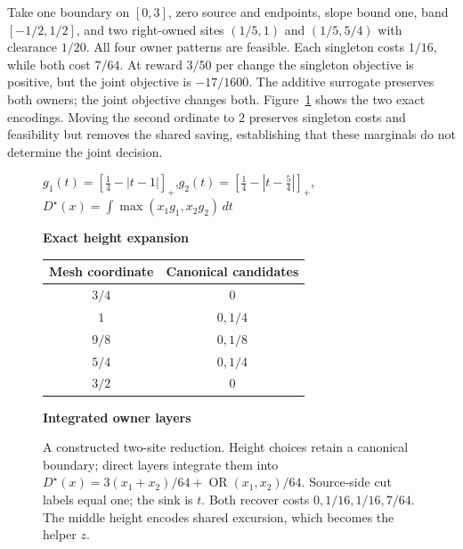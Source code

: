 \documentclass[10pt,letterpaper]{article}
\begin{document}
Take one boundary on $[0,3]$, zero source and endpoints, slope bound one, band $[-1/2,1/2]$, and two right-owned sites $(1/5,1)$ and $(1/5,5/4)$ with clearance $1/20$. All four owner patterns are feasible. Each singleton costs $1/16$, while both cost $7/64$. At reward $3/50$ per change the singleton objective is positive, but the joint objective is $-17/1600$. The additive surrogate preserves both owners; the joint objective changes both. Figure~\ref{fig:reduction} shows the two exact encodings. Moving the second ordinate to $2$ preserves singleton costs and feasibility but removes the shared saving, establishing that these marginals do not determine the joint decision.

\begin{figure}[t]\centering
{\normalsize $g_1(t)=[\tfrac14-|t-1|]_+$,\quad $g_2(t)=[\tfrac14-|t-\tfrac54|]_+$,\quad
$D^\star(x)=\int\max(x_1g_1,x_2g_2)\,dt$}\par\medskip
\begin{minipage}[c]{.50\linewidth}\centering
\textbf{Exact height expansion}\\[4pt]
\begin{tabular}{cc}\toprule
Mesh coordinate & Canonical candidates\\\midrule
$3/4$ & $0$\\
$1$ & $0,1/4$\\
$9/8$ & $0,1/8$\\
$5/4$ & $0,1/4$\\
$3/2$ & $0$\\\bottomrule
\end{tabular}
\end{minipage}\hfill
\begin{minipage}[c]{.47\linewidth}\centering
\textbf{Integrated owner layers}\\[3pt]
\end{minipage}
\caption{A constructed two-site reduction. Height choices retain a canonical boundary; direct layers integrate them into $D^\star(x)=3(x_1+x_2)/64+\operatorname{OR}(x_1,x_2)/64$. Source-side cut labels equal one; the sink is $t$. Both recover costs $0,1/16,1/16,7/64$. The middle height encodes shared excursion, which becomes the helper $z$.}\label{fig:reduction}
\end{figure}
\end{document}
